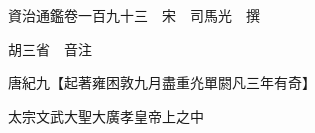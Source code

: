 










 


 
 


 

  
  
  
  
  





  
  
  
  
  
 
  

  

  
  
  



  

 
 

  
   




  

  
  


  　　資治通鑑卷一百九十三　宋　司馬光　撰

　　胡三省　音注

　　唐紀九【起著雍困敦九月盡重灮單閼凡三年有奇】

　　太宗文武大聖大廣孝皇帝上之中

